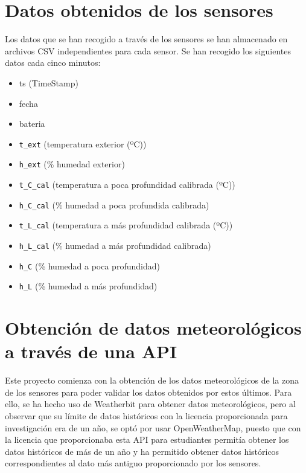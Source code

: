 \setcounter{secnumdepth}{4}


\section{Datos obtenidos de los sensores}

Los datos que se han recogido a través de los sensores se han almacenado en archivos CSV independientes para cada sensor. Se han recogido los siguientes datos cada cinco minutos:

\begin{itemize}
    \item ts (TimeStamp)
    \item fecha
    \item bateria
    \item \texttt{t\_ext} (temperatura exterior (ºC))
    \item \texttt{h\_ext} (\% humedad exterior)
    \item \texttt{t\_C\_cal} (temperatura a poca profundidad calibrada (ºC))
    \item \texttt{h\_C\_cal} (\% humedad a poca profundida calibrada)
    \item \texttt{t\_L\_cal} (temperatura a más profundidad calibrada (ºC))
    \item \texttt{h\_L\_cal} (\% humedad a más profundidad calibrada)
    \item \texttt{h\_C} (\% humedad a poca profundidad)
    \item \texttt{h\_L} (\% humedad a más profundidad)
\end{itemize}

\section{Obtención de datos meteorológicos a través de una API}

Este proyecto comienza con la obtención de los datos meteorológicos de la zona de los sensores para poder validar los datos obtenidos por estos últimos. Para ello, se ha hecho uso de Weatherbit para obtener datos meteorológicos, pero al observar que su límite de datos históricos con la licencia proporcionada para investigación era de un año, se optó por usar OpenWeatherMap, puesto que con la licencia que proporcionaba esta API para estudiantes permitía obtener los datos históricos de más de un año y ha permitido obtener datos históricos correspondientes al dato más antiguo proporcionado por los sensores.

